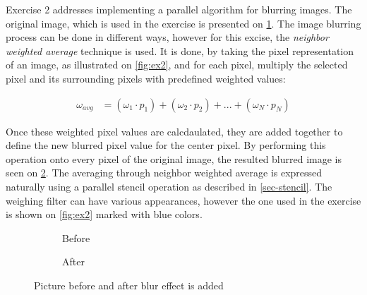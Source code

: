 Exercise 2 addresses implementing a parallel algorithm for blurring images.
The original image, which is used in the exercise is presented on \cref{fig:ex2-before}.
The image blurring process can be done in different ways, however for this excise, the \textit{neighbor weighted average} technique is used.
It is done, by taking the pixel representation of an image, as illustrated on \cref{fig:ex2}, and for each pixel, multiply the selected pixel and its surrounding pixels with predefined weighted values:

\begin{align*}
\omega_{avg} &= (\omega_1 \cdot p_1) + (\omega_2 \cdot p_2) + ... + (\omega_N \cdot p_N) 
\end{align*} 

Once these weighted pixel values are calcdaulated, they are added together to define the new blurred pixel value for the center pixel. 
By performing this operation onto every pixel of the original image, the resulted blurred image is seen on \cref{fig:ex2-after}.
The averaging through neighbor weighted average is expressed naturally using a parallel stencil operation as described in \cref{sec-stencil}.
The weighing filter can have various appearances, however the one used in the exercise is shown on \cref{fig:ex2} marked with blue colors.

\begin{figure}[ht]
	\centering
	\begin{subfigure}{.5\textwidth}
		\centering
		\caption{Before}
		\label{fig:ex2-before}
	\end{subfigure}%
	\begin{subfigure}{.5\textwidth}
		\centering
		\caption{After}
		\label{fig:ex2-after}
	\end{subfigure}
	\caption{Picture before and after blur effect is added}
	\label{fig:ex4}
\end{figure}

